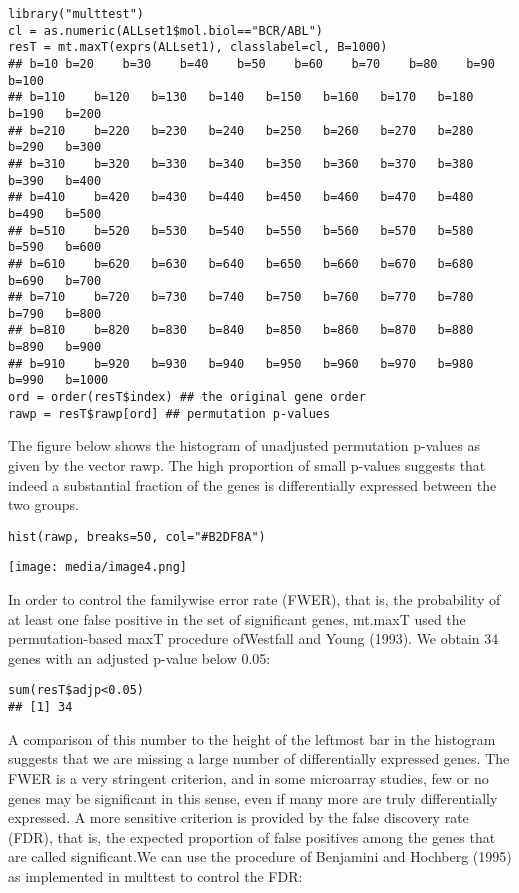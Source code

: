 \begin{verbatim}
library("multtest")
cl = as.numeric(ALLset1$mol.biol=="BCR/ABL")
resT = mt.maxT(exprs(ALLset1), classlabel=cl, B=1000)
## b=10 b=20    b=30    b=40    b=50    b=60    b=70    b=80    b=90    b=100   
## b=110    b=120   b=130   b=140   b=150   b=160   b=170   b=180   b=190   b=200   
## b=210    b=220   b=230   b=240   b=250   b=260   b=270   b=280   b=290   b=300   
## b=310    b=320   b=330   b=340   b=350   b=360   b=370   b=380   b=390   b=400   
## b=410    b=420   b=430   b=440   b=450   b=460   b=470   b=480   b=490   b=500   
## b=510    b=520   b=530   b=540   b=550   b=560   b=570   b=580   b=590   b=600   
## b=610    b=620   b=630   b=640   b=650   b=660   b=670   b=680   b=690   b=700   
## b=710    b=720   b=730   b=740   b=750   b=760   b=770   b=780   b=790   b=800   
## b=810    b=820   b=830   b=840   b=850   b=860   b=870   b=880   b=890   b=900   
## b=910    b=920   b=930   b=940   b=950   b=960   b=970   b=980   b=990   b=1000  
ord = order(resT$index) ## the original gene order
rawp = resT$rawp[ord] ## permutation p-values
\end{verbatim}

The figure below shows the histogram of unadjusted permutation p-values
as given by the vector rawp. The high proportion of small p-values
suggests that indeed a substantial fraction of the genes is
differentially expressed between the two groups.

\begin{verbatim}
hist(rawp, breaks=50, col="#B2DF8A")
\end{verbatim}

\texttt{[image: media/image4.png]}

In order to control the familywise error rate (FWER), that is, the
probability of at least one false positive in the set of significant
genes, mt.maxT used the permutation-based maxT procedure ofWestfall and
Young (1993). We obtain 34 genes with an adjusted p-value below 0.05:

\begin{verbatim}
sum(resT$adjp<0.05)
## [1] 34
\end{verbatim}

A comparison of this number to the height of the leftmost bar in the
histogram suggests that we are missing a large number of differentially
expressed genes. The FWER is a very stringent criterion, and in some
microarray studies, few or no genes may be significant in this sense,
even if many more are truly differentially expressed. A more sensitive
criterion is provided by the false discovery rate (FDR), that is, the
expected proportion of false positives among the genes that are called
significant.We can use the procedure of Benjamini and Hochberg (1995) as
implemented in multtest to control the FDR:

